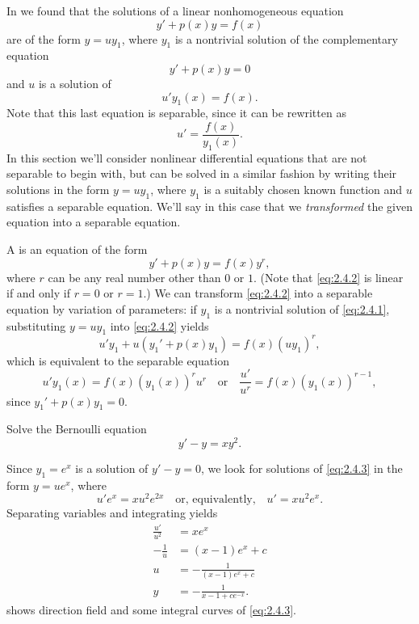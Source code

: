 In  we found that the solutions of a linear
nonhomogeneous equation
\[
y'+p(x)y=f(x)
\]
are of the form $y=uy_1$, where $y_1$ is a nontrivial solution of the
complementary equation
\begin{equation} \label{eq:2.4.1}
y'+p(x)y=0
\end{equation}
and $u$ is a solution of
\[
u'y_1(x)=f(x).
\]
Note that this last equation is separable, since it can be rewritten
as
\[
u'=\frac{f(x)}{y_1(x)}.
\]
In this section we'll consider nonlinear differential equations
that are not separable to begin with, but can be solved in a similar
fashion by writing their solutions in the form $y=uy_1$, where $y_1$
is a suitably chosen known function and $u$ satisfies a separable
equation. We'll say in this case  that we \emph{\color{blue}transformed}
the given equation into a separable equation.



A  is an equation  of
the form
\begin{equation} \label{eq:2.4.2}
y'+p(x)y=f(x)y^r,
\end{equation}
where $r$ can be any real number other than $0$ or $1$. (Note that
\eqref{eq:2.4.2} is linear if and only if $r=0$ or $r=1$.) We can
transform \eqref{eq:2.4.2} into a separable
equation
by variation of parameters:
if  $y_1$ is  a nontrivial solution of \eqref{eq:2.4.1},
substituting
$y=uy_1$ into \eqref{eq:2.4.2} yields
\[
u'y_1+u(y_1'+p(x)y_1)=f(x)(uy_1)^r,
\]
which is equivalent to the separable equation
\[
u'y_1(x)=f(x)\left(y_1(x)\right)^ru^r\quad\text{or}\quad
\frac{u'}{u^r}=f(x)\left(y_1(x)\right)^{r-1},
\]
since $y_1'+p(x)y_1=0$.

\begin{example}\label{example:2.4.1}
Solve the Bernoulli equation
\begin{equation} \label{eq:2.4.3}
y'-y=xy^2.
\end{equation}
\end{example}

\begin{solution}
Since $y_1=e^x$ is a solution of $y'-y=0$, we look for solutions of
\eqref{eq:2.4.3}  in the form $y=ue^x$, where
\[
u'e^x=xu^2e^{2x}\quad\text{or, equivalently,}\quad
u'=xu^2e^x.
\]
Separating variables and integrating yields
\begin{align*}
\frac{u'}{u^2}&=xe^x\\
-\frac{1}{u}&=(x-1)e^x+c\\
u&=-\frac{1}{(x-1)e^x+c}\\
y&=-\frac{1}{x-1+ce^{-x}}.
\end{align*}
%
  shows
direction field and some integral curves of \eqref{eq:2.4.3}.
\end{solution}

